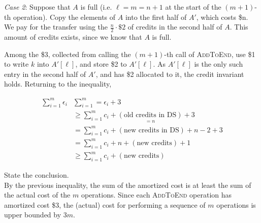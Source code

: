 \begin{description}
    \textit{Case 2}: Suppose that $A$ is full (i.e. $\ell = m = n + 1$ at the start of the $(m+1)$-th operation). Copy the elements of $A$ into the first half of $A'$, which costs \$n. We pay for the transfer using the $\frac{n}{2} \cdot \$2$ of credits in the second half of $A$. This amount of credits exists, since we know that $A$ is full. 

    Among the \$3, collected from calling the $(m+1)$-th call of \textsc{AddToEnd}, use \$1 to write $k$ into $A'[\ell]$, and store \$2 to $A'[\ell]$. As $A'[\ell]$ is the only such entry in the second half of $A'$, and has \$2 allocated to it, the credit invariant holds. Returning to the inequality,

    \begin{align*}
        \sum_{i=1}^{m} \epsilon_i & \sum_{i=1}^{m} = \epsilon_i + 3 \\
        &\geq \sum_{i=1}^{m} c_i + \underset{= n}{(\text{old credits in DS})} + 3 \\
        &= \sum_{i=1}^{m} c_i + (\text{new credits in DS}) + n - 2 + 3 \\
        &= \sum_{i=1}^{m} c_i + n + (\text{new credits}) + 1 \\
        &\geq \sum_{i=1}^{m} c_i + (\text{new credits})
    \end{align*}

    \item[Step 5] State the conclusion. \\
    By the previous inequality, the sum of the amortized cost is at least the sum of the actual cost of the $m$ operations. Since each \textsc{AddToEnd} operation has amortized cost \$3, the (actual) cost for performing a sequence of $m$ operations is upper bounded by $3m$. 

\end{description}
